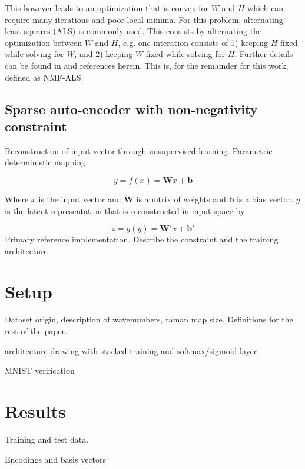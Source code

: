 \documentclass{article}
\begin{document}
This however leads to an optimization that is convex for $W$ and $H$ which can require many iterations and poor local minima. For this problem, alternating least squares (ALS) is commonly used. This consists by alternating the optimization between $W$ and $H$, e.g. one interation consists of 1) keeping $H$ fixed while solving for $W$, and 2) keeping $W$ fixed while solving for $H$. Further details can be found in  \cite{Langville2014} and references herein. This is, for the remainder for this work, defined as NMF-ALS.

\subsection{Sparse auto-encoder with non-negativity constraint}

Reconstruction of input vector through unsupervised learning. Parametric deterministic mapping \cite{Vincent}

\begin{equation}
y = f(x) = \mathbf{W}x + \mathbf{b}
\end{equation}

Where $x$ is the input vector and $\mathbf{W}$ is a mtrix of weights and $\mathbf{b}$ is a bias vector. $y$ is the latent representation that is reconstructed in input space by 

\begin{equation}
z = g(y) = \mathbf{W'}x + \mathbf{b'}
\end{equation}
Primary reference implementation. Describe the constraint and the training architecture

\section{Setup}
\label{sec:setup}


Dataset origin, description of wavenumbers, raman map size. Definitions for the rest of the paper.

architecture drawing with stacked training and softmax/sigmoid layer.

MNIST verification

\section{Results}
\label{sec:results}

Training and test data. 

Encodings and basis vectors
\end{document}
